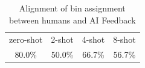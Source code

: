 \begin{table}[!t]
\caption{Alignment of bin assignment between humans and AI Feedback}
\label{table:few_shots_3}
\begin{center}
\begin{tabular}{cccc}
\toprule
zero-shot & 2-shot & 4-shot & 8-shot\\
80.0\% & 50.0\% & 66.7\% & 56.7\% \\
\bottomrule
\end{tabular}
\end{center}
\end{table}